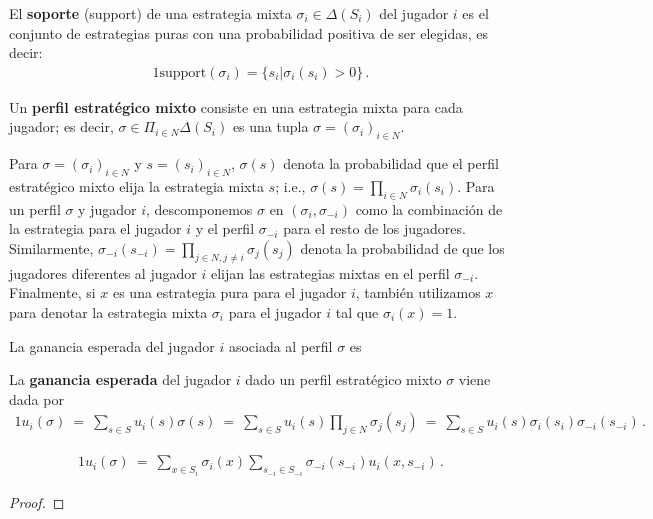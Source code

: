\begin{definition}
El \textbf{soporte} (support) de una estrategia mixta $\sigma_i \in \Delta(S_i)$ del jugador $i$ es el conjunto de estrategias puras con una probabilidad positiva de ser elegidas, es decir:
\begin{alignat}{1}
\text{support}(\sigma_i) = \{s_i | \sigma_i(s_i) > 0 \} \,.
\end{alignat}
\end{definition}

\begin{definition}
Un \textbf{perfil estratégico mixto} consiste en una estrategia mixta para cada jugador; es decir, $\sigma \in \Pi_{i \in N} \Delta(S_i)$ es una tupla $\sigma=(\sigma_i)_{i \in N}$.
\end{definition}

Para $\sigma = (\sigma_i)_{i \in N}$ y $s = (s_i)_{i \in N}$, $\sigma(s)$ denota la probabilidad que el perfil estratégico mixto elija la estrategia mixta $s$; i.e., $\sigma(s)=\prod_{i\in N} \sigma_i(s_i)$. Para un perfil $\sigma$ y jugador $i$, descomponemos $\sigma$ en $(\sigma_i,\sigma_{-i})$ como la combinaci\'on de la estrategia para el jugador $i$ y el perfil $\sigma_{-i}$ para el resto de los jugadores. Similarmente, $\sigma_{-i}(s_{-i})=\prod_{j\in N,j\neq i}\sigma_j(s_j)$ denota la probabilidad de que los jugadores diferentes al jugador $i$ elijan las estrategias mixtas en el perfil $\sigma_{-i}$. Finalmente, si $x$ es una estrategia pura para el jugador $i$, tambi\'en utilizamos $x$ para denotar la estrategia mixta $\sigma_i$ para el jugador $i$ tal que $\sigma_i(x)=1$.

La ganancia esperada del jugador $i$ asociada al perfil $\sigma$ es

\begin{definition}
\label{def:ganancia-esperada}
La \textbf{ganancia esperada} del jugador $i$ dado un perfil estratégico mixto $\sigma$ viene dada por
\begin{alignat}{1}
	u_i(\sigma)\ =\ \sum_{s \in S} u_i(s) \sigma(s)\ =\ \sum_{s \in S} u_i(s) \prod _{j \in N} \sigma_j(s_j)\ =\ \sum_{s \in S} u_i(s) \sigma_i(s_i) \sigma_{-i}(s_{-i})\,.
\end{alignat}
\end{definition}

\begin{lemma}
\label{lemma:1}
\begin{alignat}{1}
u_i(\sigma)\ =\ \sum_{x\in S_i} \sigma_i(x) \sum_{s_{-i}\in S_{-i}} \sigma_{-i}(s_{-i}) u_i(x,s_{-i}) \,.
\end{alignat}
\end{lemma}
\begin{proof}
\end{proof}

